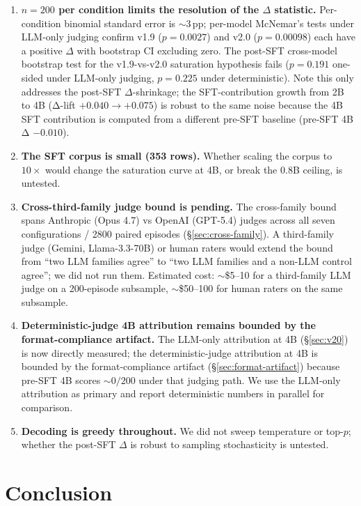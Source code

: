 \documentclass[10pt]{article}
\begin{document}
\begin{enumerate}[leftmargin=*]
  \item \textbf{$n{=}200$ per condition limits the resolution of the $\Delta$ statistic.} Per-condition binomial standard error is $\sim\!3$\,pp; per-model McNemar's tests under LLM-only judging confirm v1.9 ($p{=}0.0027$) and v2.0 ($p{=}0.00098$) each have a positive $\Delta$ with bootstrap CI excluding zero. The post-SFT cross-model bootstrap test for the v1.9-vs-v2.0 saturation hypothesis fails ($p{=}0.191$ one-sided under LLM-only judging, $p{=}0.225$ under deterministic). Note this only addresses the post-SFT $\Delta$-shrinkage; the SFT-contribution growth from 2B to 4B (Δ-lift $+0.040 \to +0.075$) is robust to the same noise because the 4B SFT contribution is computed from a different pre-SFT baseline (pre-SFT 4B Δ $-0.010$).
  \item \textbf{The SFT corpus is small (353 rows).} Whether scaling the corpus to $10\times$ would change the saturation curve at 4B, or break the 0.8B ceiling, is untested.
  \item \textbf{Cross-third-family judge bound is pending.} The cross-family bound spans Anthropic (Opus 4.7) vs OpenAI (GPT-5.4) judges across all seven configurations / 2800 paired episodes (\S\ref{sec:cross-family}). A third-family judge (Gemini, Llama-3.3-70B) or human raters would extend the bound from ``two LLM families agree'' to ``two LLM families and a non-LLM control agree''; we did not run them. Estimated cost: $\sim$\$5--10 for a third-family LLM judge on a 200-episode subsample, $\sim$\$50--100 for human raters on the same subsample.
  \item \textbf{Deterministic-judge 4B attribution remains bounded by the format-compliance artifact.} The LLM-only attribution at 4B (\S\ref{sec:v20}) is now directly measured; the deterministic-judge attribution at 4B is bounded by the format-compliance artifact (\S\ref{sec:format-artifact}) because pre-SFT 4B scores $\sim\!0/200$ under that judging path. We use the LLM-only attribution as primary and report deterministic numbers in parallel for comparison.
  \item \textbf{Decoding is greedy throughout.} We did not sweep temperature or top-$p$; whether the post-SFT $\Delta$ is robust to sampling stochasticity is untested.
\end{enumerate}

\section{Conclusion}
\end{document}
